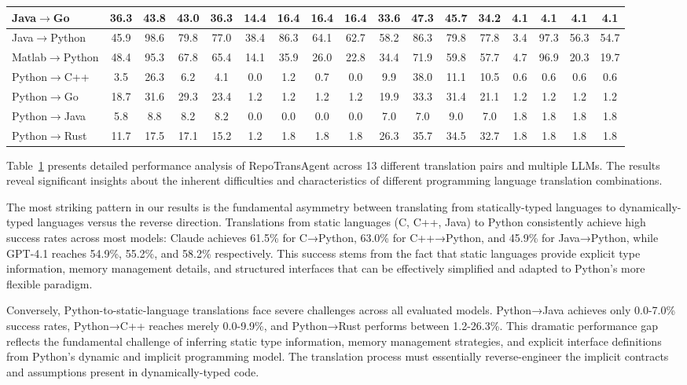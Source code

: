 \begin{table}[t]
{\begin{tabular}{|l|c|c|c|c|c|c|c|c|c|c|c|c|c|c|c|c|}
    \hline
    Java$\rightarrow$Go & 36.3 & 43.8 & 43.0 & 36.3 & 14.4 & 16.4 & 16.4 & 16.4 & 33.6 & 47.3 & 45.7 & 34.2 & 4.1 & 4.1 & 4.1 & 4.1 \\
    \hline
    Java$\rightarrow$Python & 45.9 & 98.6 & 79.8 & 77.0 & 38.4 & 86.3 & 64.1 & 62.7 & 58.2 & 86.3 & 79.8 & 77.8 & 3.4 & 97.3 & 56.3 & 54.7 \\
    \hline
    Matlab$\rightarrow$Python & 48.4 & 95.3 & 67.8 & 65.4 & 14.1 & 35.9 & 26.0 & 22.8 & 34.4 & 71.9 & 59.8 & 57.7 & 4.7 & 96.9 & 20.3 & 19.7 \\
    \hline
    Python$\rightarrow$C++ & 3.5 & 26.3 & 6.2 & 4.1 & 0.0 & 1.2 & 0.7 & 0.0 & 9.9 & 38.0 & 11.1 & 10.5 & 0.6 & 0.6 & 0.6 & 0.6 \\
    \hline
    Python$\rightarrow$Go & 18.7 & 31.6 & 29.3 & 23.4 & 1.2 & 1.2 & 1.2 & 1.2 & 19.9 & 33.3 & 31.4 & 21.1 & 1.2 & 1.2 & 1.2 & 1.2 \\
    \hline
    Python$\rightarrow$Java & 5.8 & 8.8 & 8.2 & 8.2 & 0.0 & 0.0 & 0.0 & 0.0 & 7.0 & 7.0 & 9.0 & 7.0 & 1.8 & 1.8 & 1.8 & 1.8 \\
    \hline
    Python$\rightarrow$Rust & 11.7 & 17.5 & 17.1 & 15.2 & 1.2 & 1.8 & 1.8 & 1.8 & 26.3 & 35.7 & 34.5 & 32.7 & 1.8 & 1.8 & 1.8 & 1.8 \\
    \hline
    \end{tabular}}%
 \label{table:translationPairs}
\end{table}


Table~\ref{table:translationPairs} presents detailed performance analysis of RepoTransAgent across 13 different translation pairs and multiple LLMs. The results reveal significant insights about the inherent difficulties and characteristics of different programming language translation combinations.

The most striking pattern in our results is the fundamental asymmetry between translating from statically-typed languages to dynamically-typed languages versus the reverse direction. Translations from static languages (C, C++, Java) to Python consistently achieve high success rates across most models: Claude achieves 61.5\% for C→Python, 63.0\% for C++→Python, and 45.9\% for Java→Python, while GPT-4.1 reaches 54.9\%, 55.2\%, and 58.2\% respectively. This success stems from the fact that static languages provide explicit type information, memory management details, and structured interfaces that can be effectively simplified and adapted to Python's more flexible paradigm.

Conversely, Python-to-static-language translations face severe challenges across all evaluated models. Python→Java achieves only 0.0-7.0\% success rates, Python→C++ reaches merely 0.0-9.9\%, and Python→Rust performs between 1.2-26.3\%. This dramatic performance gap reflects the fundamental challenge of inferring static type information, memory management strategies, and explicit interface definitions from Python's dynamic and implicit programming model. The translation process must essentially reverse-engineer the implicit contracts and assumptions present in dynamically-typed code.

